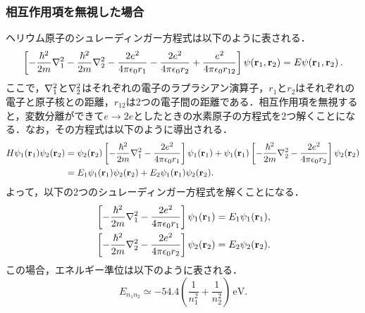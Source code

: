 \documentclass[a4paper,dvipdfmx,10.5pt]{jarticle}
\begin{document}
\subsubsection{相互作用項を無視した場合}
ヘリウム原子のシュレーディンガー方程式は以下のように表される．
\begin{equation}
  \left[-\frac{\hbar^2}{2m} \laplacian_1 - \frac{\hbar^2}{2m} \laplacian_2 - \frac{2e^2}{4\pi \epsilon_0 r_1} - \frac{2e^2}{4\pi \epsilon_0 r_2} + \frac{e^2}{4\pi \epsilon_0 r_{12}} \right] \psi(\mathbf{r}_1, \mathbf{r}_2) = E \psi(\mathbf{r}_1, \mathbf{r}_2)\,.\label{eq:He_Schrodinger}
\end{equation}
ここで，$\laplacian_1$と$\laplacian_2$はそれぞれの電子のラプラシアン演算子，$r_1$と$r_2$はそれぞれの電子と原子核との距離，$r_{12}$は2つの電子間の距離である．相互作用項を無視すると，変数分離ができて$e\to2e$としたときの水素原子の方程式を2つ解くことになる．なお，その方程式は以下のように導出される．
\begin{align}
  H\psi_1(\mathbf{r}_1)\psi_2(\mathbf{r}_2) &= \psi_2(\mathbf{r}_2) \left[-\frac{\hbar^2}{2m} \laplacian_1 - \frac{2e^2}{4\pi \epsilon_0 r_1} \right] \psi_1(\mathbf{r}_1) + \psi_1(\mathbf{r}_1) \left[-\frac{\hbar^2}{2m} \laplacian_2 - \frac{2e^2}{4\pi \epsilon_0 r_2} \right] \psi_2(\mathbf{r}_2)\\
  &=E_1 \psi_1(\mathbf{r}_1)\psi_2(\mathbf{r}_2) + E_2 \psi_1(\mathbf{r}_1)\psi_2(\mathbf{r}_2).
\end{align}
よって，以下の2つのシュレーディンガー方程式を解くことになる．
\begin{align}
  &\left[-\frac{\hbar^2}{2m} \laplacian_1 - \frac{2e^2}{4\pi \epsilon_0 r_1} \right] \psi_1(\mathbf{r}_1) = E_1 \psi_1(\mathbf{r}_1),\\
  &\left[-\frac{\hbar^2}{2m} \laplacian_2 - \frac{2e^2}{4\pi \epsilon_0 r_2} \right] \psi_2(\mathbf{r}_2) = E_2 \psi_2(\mathbf{r}_2).
\end{align}
この場合，エネルギー準位は以下のように表される．
\begin{equation}
  E_{n_1 n_2} \simeq -54.4 \left( \frac{1}{n_1^2} + \frac{1}{n_2^2} \right) \, \text{eV}.\label{eq:He_energy_no_interaction}
\end{equation}
\end{document}
